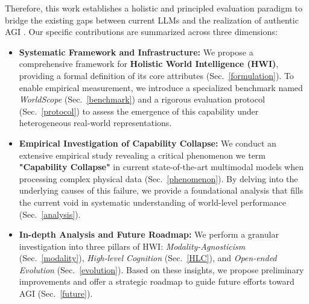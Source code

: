 Therefore, this work establishes a holistic and principled evaluation paradigm to bridge the existing gaps between current LLMs and the realization of authentic AGI \cite{mahowald2024dissociating}. Our specific contributions are summarized across three dimensions:
\begin{itemize}[leftmargin=*]
\item \textbf{Systematic Framework and Infrastructure:} We propose a comprehensive framework for \textbf{Holistic World Intelligence (HWI)}, providing a formal definition of its core attributes (Sec.~\ref{formulation}). To enable empirical measurement, we introduce a specialized benchmark named \emph{WorldScope} (Sec.~\ref{benchmark}) and a rigorous evaluation protocol (Sec.~\ref{protocol}) to assess the emergence of this capability under heterogeneous real-world representations.
\item \textbf{Empirical Investigation of Capability Collapse:} We conduct an extensive empirical study revealing a critical phenomenon we term \textbf{"Capability Collapse"} in current state-of-the-art multimodal models when processing complex physical data (Sec.~\ref{phenomenon}). By delving into the underlying causes of this failure, we provide a foundational analysis that fills the current void in systematic understanding of world-level performance (Sec.~\ref{analysis}).
\item \textbf{In-depth Analysis and Future Roadmap:} We perform a granular investigation into three pillars of HWI: \emph{Modality-Agnosticism} (Sec.~\ref{modality}), \emph{High-level Cognition} (Sec.~\ref{HLC}), and \emph{Open-ended Evolution} (Sec.~\ref{evolution}). Based on these insights, we propose preliminary improvements and offer a strategic roadmap to guide future efforts toward AGI (Sec.~\ref{future}).
\end{itemize}



